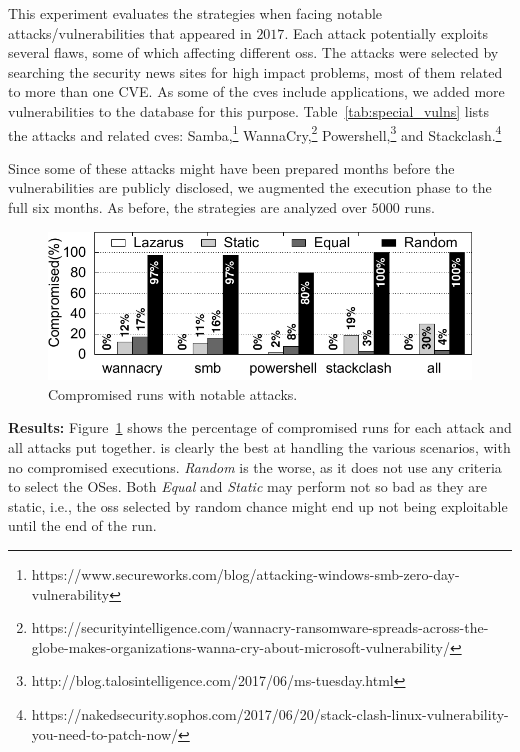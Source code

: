 This experiment evaluates the strategies when facing notable attacks/vulnerabilities that appeared in $2017$. 
Each attack potentially exploits several flaws, some of which affecting different \glspl{os}. 
The attacks were selected by searching the security news sites for high impact problems, most of them related to more than one CVE. 
As some of the \glspl{cve} include applications, we added more vulnerabilities to the database for this purpose.
Table~\ref{tab:special_vulns} lists the attacks and related \glspl{cve}: Samba,\footnote{https://www.secureworks.com/blog/attacking-windows-smb-zero-day-vulnerability} WannaCry,\footnote{https://securityintelligence.com/wannacry-ransomware-spreads-across-the-globe-makes-organizations-wanna-cry-about-microsoft-vulnerability/} Powershell,\footnote{http://blog.talosintelligence.com/2017/06/ms-tuesday.html} and Stackclash.\footnote{https://nakedsecurity.sophos.com/2017/06/20/stack-clash-linux-vulnerability-you-need-to-patch-now/}


Since some of these attacks might have been prepared months before the vulnerabilities are publicly disclosed, we augmented the execution phase to the full six months. 
As before, the strategies are analyzed over $5000$ runs.


\begin{figure}[t]
\begin{center}
\includegraphics[width=\columnwidth]{images/gnuplot/special_vulns/execution-special.pdf}
\caption{Compromised runs with notable attacks.}
\label{fig:special_vulns}
\end{center}
\end{figure}

\textbf{Results:}
Figure~\ref{fig:special_vulns} shows the percentage of compromised runs for each attack and all attacks put together.
\system is clearly the best at handling the various scenarios, with no compromised executions.
\emph{Random} is the worse, as it does not use any criteria to select the OSes. 
Both \emph{Equal} and \emph{Static} may perform not so bad as they are static, i.e., the \glspl{os} selected by random chance might end up not being exploitable until the end of the run.

